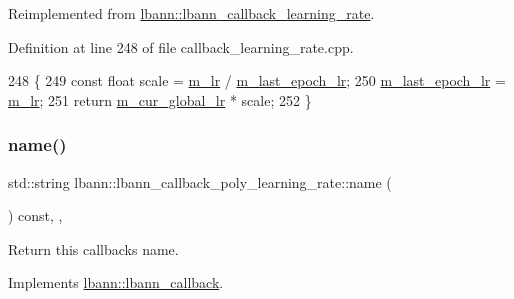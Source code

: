 Reimplemented from \hyperlink{classlbann_1_1lbann__callback__learning__rate_a7869b93e5963d6f76da68d8c8137b979}{lbann\+::lbann\+\_\+callback\+\_\+learning\+\_\+rate}.



Definition at line 248 of file callback\+\_\+learning\+\_\+rate.\+cpp.


\begin{DoxyCode}
248                                                                  \{
249   \textcolor{keyword}{const} \textcolor{keywordtype}{float} scale = \hyperlink{classlbann_1_1lbann__callback__poly__learning__rate_a02cb265abba03e10fcba2be3cbbafce4}{m\_lr} / \hyperlink{classlbann_1_1lbann__callback__poly__learning__rate_aad95c34cfb705392bf38ecbb0dc97b32}{m\_last\_epoch\_lr};
250   \hyperlink{classlbann_1_1lbann__callback__poly__learning__rate_aad95c34cfb705392bf38ecbb0dc97b32}{m\_last\_epoch\_lr} = \hyperlink{classlbann_1_1lbann__callback__poly__learning__rate_a02cb265abba03e10fcba2be3cbbafce4}{m\_lr};
251   \textcolor{keywordflow}{return} \hyperlink{classlbann_1_1lbann__callback__learning__rate_a97194f282c29a748c915d9811a8a99fb}{m\_cur\_global\_lr} * scale;
252 \}
\end{DoxyCode}
\mbox{\label{classlbann_1_1lbann__callback__poly__learning__rate_a755be6dc66e1c403edc69db11592a4ea}} 
\subsubsection{\texorpdfstring{name()}{name()}}
{\footnotesize\ttfamily std\+::string lbann\+::lbann\+\_\+callback\+\_\+poly\+\_\+learning\+\_\+rate\+::name (\begin{DoxyParamCaption}{ }\end{DoxyParamCaption}) const\hspace{0.3cm}{\ttfamily [inline]}, {\ttfamily [override]}, {\ttfamily [virtual]}}

Return this callback\textquotesingle{}s name. 

Implements \hyperlink{classlbann_1_1lbann__callback_a7522c7a14f1d6a1ea762cc2d7248eb3a}{lbann\+::lbann\+\_\+callback}.



